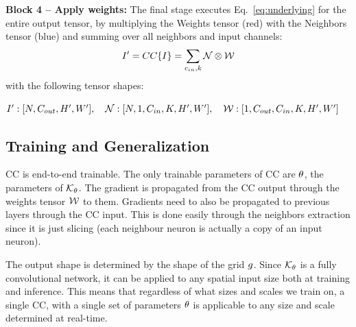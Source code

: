 \textbf{Block 4 -- Apply weights:} The final stage executes Eq.~\ref{eq:underlying} for the entire output tensor,
by multiplying the Weights tensor (red) with the Neighbors tensor (blue) and summing over all neighbors and input channels:
\vspace*{-0.4cm}
\begin{align}
\textcolor{black}{I'}=
CC\{\textcolor{black}{I}\}= \sum_{c_{in}, k} \textcolor{black}{\mathcal{N}} \otimes \textcolor{black}{\mathcal{W}}
\end{align} 
with the following tensor shapes: 

$ \textcolor{black}{I'}:[N,C_{out},H',W'], \quad \textcolor{black}{\mathcal{N}}: [N,1,C_{in},K,H',W'], \quad \textcolor{black}{\mathcal{W}}:[1,C_{out},C_{in},K,H',W'] $

\subsection{Training and Generalization}
\label{sec:train}
CC is end-to-end trainable. The only trainable parameters of CC are $\textcolor{black}{\theta}$,  the parameters of $\textcolor{black}{\mathcal{K}_\theta}$. The gradient is propagated from the CC output through the weights tensor $\textcolor{black}{\mathcal{W}}$ to them. Gradients need to also be propagated to previous layers through the CC input. This is done easily through the neighbors extraction since it is just slicing (each neighbour neuron is actually a copy of an input neuron).

The output shape is determined by the shape of the grid $\textcolor{black}{{g}}$. Since $\textcolor{black}{\mathcal{K}_\theta}$ is a fully convolutional network, it can be applied to any spatial input size both at training and inference. This means that regardless of what sizes and scales we train on, a single CC, with a single set of parameters $\textcolor{black}{\theta}$ is applicable to any size and scale determined at real-time.

